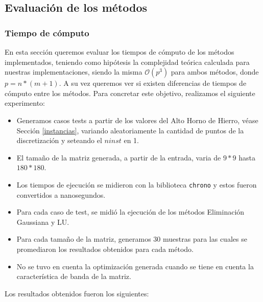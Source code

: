 \subsection{Evaluación de los métodos}

\subsubsection{Tiempo de cómputo}

En esta sección queremos evaluar los tiempos de cómputo de los métodos implementados, teniendo como hipótesis la complejidad teórica calculada para nuestras implementaciones,
siendo la misma $\mathcal{O}(p^3)$ para ambos métodos, donde $p = n*(m+1)$. A su vez queremos ver si existen diferencias de tiempos de cómputo entre los métodos.
\newline
\newline
Para concretar este objetivo, realizamos el siguiente experimento:
\begin{itemize}
    \item Generamos casos tests a partir de los valores del Alto Horno de Hierro, véase Sección \ref{instancias}, variando aleatoriamente la cantidad de puntos de la discretización y seteando el $ninst$ en 1.
    \item El tamaño de la matriz generada, a partir de la entrada, varia de $9*9$ hasta $180*180$.
    \item Los tiempos de ejecución se midieron con la biblioteca \texttt{chrono} y estos fueron convertidos a nanosegundos.
    \item Para cada caso de test, se midió la ejecución de los métodos Eliminación Gaussiana y LU.
    \item Para cada tamaño de la matriz, generamos $30$ muestras para las cuales se promediaron los resultados obtenidos para cada método.
    \item No se tuvo en cuenta la optimización generada cuando se tiene en cuenta la característica de banda de la matriz.
\end{itemize}


Los resultados obtenidos fueron los siguientes:

\begin{center}
\end{center}

